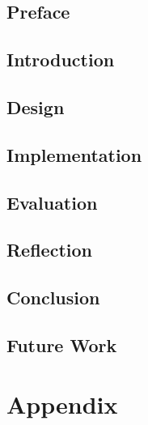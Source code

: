 





\chapter*{Preface}

\tableofcontents

\chapter{Introduction}





\chapter{Design}


\chapter{Implementation}


\chapter{Evaluation}




\chapter{Reflection}


\chapter{Conclusion}


\chapter{Future Work}


\printbibliography

\part{Appendix}
\appendix


